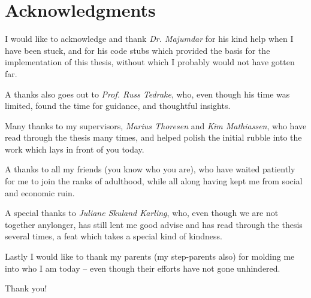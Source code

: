 \chapter{Acknowledgments}

\noindent \textsf{I} would like to acknowledge and thank \textit{Dr.
  Majumdar} for his kind help when I have been stuck, and for his code stubs
which provided the basis for the implementation of this thesis, without which I
probably would not have gotten far.

\vspace{1em}

\noindent \textsf{A} thanks also goes out to \textit{Prof. Russ
  Tedrake}, who, even though his time was limited, found the time for guidance,
and thoughtful insights.

\vspace{1em}

\noindent \textsf{M}any thanks to my supervisors, \textit{Marius
  Thoresen} and \textit{Kim Mathiassen}, who have read through the thesis many
times, and helped polish the initial rubble into the work which lays in front of
you today.

\vspace{1em}

\noindent \textsf{A} thanks to all my friends (you know who you are),
who have waited patiently for me to join the ranks of adulthood, while all along
having kept me from social and economic ruin.

\vspace{1em}

\noindent \textsf{A} special thanks to \textit{Juliane Skuland
  Karling}, who, even though we are not together anylonger, has still lent me
good advise and has read through the thesis several times, a feat which takes a
special kind of kindness.

\vspace{1em}

\noindent \textsf{L}astly I would like to thank my parents (my
step-parents also) for molding me into who I am today -- even though their
efforts have not gone unhindered.

\vspace{3em}

{
  \centering \textsf{Thank you!}\par
}
